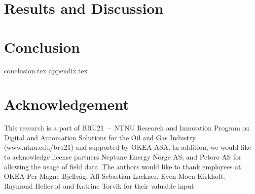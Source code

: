 \documentclass[authoryear]{elsarticle}
\begin{document}
\section{Results and Discussion}

\section{Conclusion}
{conclusion.tex}
{appendix.tex}
\section*{Acknowledgement}
This research is a part of BRU21~–~NTNU Research and Innovation Program on 
Digital and Automation Solutions for the Oil and Gas Industry \linebreak (www.ntnu.edu/bru21) 
and supported by OKEA ASA\@. In addition, we would like to acknowledge license 
partners Neptune Energy Norge AS, and Petoro AS for allowing the usage of field 
data. The authors would like to thank employees at OKEA Per Magne Bjellvåg, 
Alf Sebastian Lackner, Even Moen Kirkholt, Raymond Hellerud and Katrine Torvik 
for their valuable input.


\end{document}
